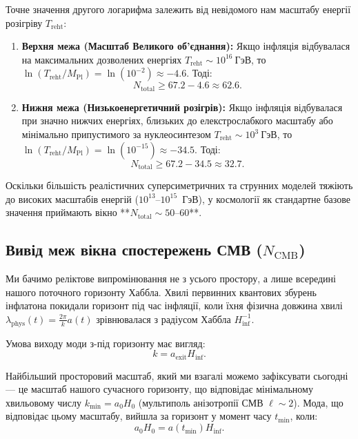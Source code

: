 \documentclass[12pt, a4paper]{article}
\begin{document}
Точне значення другого логарифма залежить від невідомого нам масштабу енергії розігріву $T_{\mathrm{reht}}$:
\begin{enumerate}
    \item \textbf{Верхня межа (Масштаб Великого об'єднання):} Якщо інфляція відбувалася на максимальних дозволених енергіях $T_{\mathrm{reht}} \sim 10^{16}~\text{ГэВ}$, то $\ln(T_{\mathrm{reht}}/M_{\mathrm{Pl}}) = \ln(10^{-2}) \approx -4.6$. Тоді:
    \begin{equation}
    N_{\mathrm{total}} \ge 67.2 - 4.6 \approx \mathbf{62.6}.
    \end{equation}
    \item \textbf{Нижня межа (Низькоенергетичний розігрів):} Якщо інфляція відбувалася при значно нижчих енергіях, близьких до елекстрослабкого масштабу або мінімально припустимого за нуклеосинтезом $T_{\mathrm{reht}} \sim 10^{3}~\text{ГэВ}$, то $\ln(T_{\mathrm{reht}}/M_{\mathrm{Pl}}) = \ln(10^{-15}) \approx -34.5$. Тоді:
    \begin{equation}
    N_{\mathrm{total}} \ge 67.2 - 34.5 \approx \mathbf{32.7}.
    \end{equation}
\end{enumerate}
Оскільки більшість реалістичних суперсиметричних та струнних моделей тяжіють до високих масштабів енергій ($10^{13}$--$10^{15}$~ГэВ), у космології як стандартне базове значення приймають вікно **$N_{\mathrm{total}} \sim 50$--$60$**.



\subsection{Вивід меж вікна спостережень СМВ ($N_{\mathrm{CMB}}$)}

Ми бачимо реліктове випромінювання не з усього простору, а лише всередині нашого поточного горизонту Хаббла. Хвилі первинних квантових збурень інфлатона покидали горизонт під час інфляції, коли їхня фізична довжина хвилі $\lambda_{\mathrm{phys}}(t) = \frac{2\pi}{k} a(t)$ зрівнювалася з радіусом Хаббла $H_{\mathrm{inf}}^{-1}$.

Умова виходу моди з-під горизонту має вигляд:
\begin{equation}
\label{eq:app_exit}
k = a_{\mathrm{exit}} H_{\mathrm{inf}}.
\end{equation}

Найбільший просторовий масштаб, який ми взагалі можемо зафіксувати сьогодні --- це масштаб нашого сучасного горизонту, що відповідає мінімальному хвильовому числу $k_{\mathrm{min}} = a_0 H_0$ (мультиполь анізотропії СМВ $\ell \sim 2$). Мода, що відповідає цьому масштабу, вийшла за горизонт у момент часу $t_{\mathrm{min}}$, коли:
\begin{equation}
a_0 H_0 = a(t_{\mathrm{min}}) H_{\mathrm{inf}}.
\end{equation}
\end{document}
